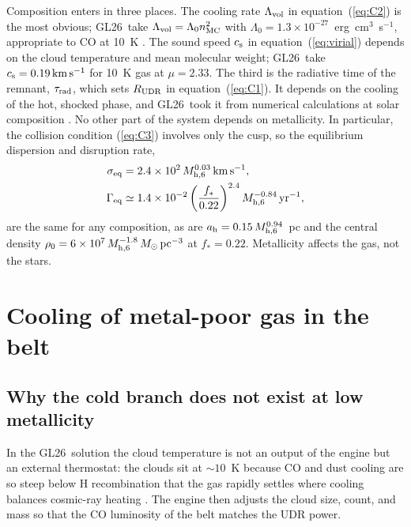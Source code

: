\documentclass[twocolumn,pdftex]{aastex701}
\newcommand{\msun}{M_{\odot}}
\newcommand{\mhsix}{M_{\rm h,6}}
\newcommand{\fst}{f_{\ast}}
\newcommand{\Geq}{\Gamma_{\rm eq}}
\newcommand{\GL}{GL26}
\newcommand{\kms}{\,{\rm km\,s^{-1}}}
\begin{document}
Composition enters in three places. The cooling rate $\Lambda_{\rm vol}$ in equation~(\ref{eq:C2}) is the most obvious; \GL\ take $\Lambda_{\rm vol} = \Lambda_0 n_{\rm MC}^{2}$ with $\Lambda_0 = 1.3\times10^{-27}$~erg~cm$^{3}$~s$^{-1}$, appropriate to CO at 10~K \citep{Goldsmith:1978a,Neufeld:1995a}. The sound speed $c_{\rm s}$ in equation~(\ref{eq:virial}) depends on the cloud temperature and mean molecular weight; \GL\ take $c_{\rm s} = 0.19\kms$ for 10~K gas at $\mu = 2.33$. The third is the radiative time of the remnant, $\tau_{\rm rad}$, which sets $R_{\rm UDR}$ in equation~(\ref{eq:C1}). It depends on the cooling of the hot, shocked phase, and \GL\ took it from numerical calculations at solar composition \citep{Blondin:1998a}. No other part of the system depends on metallicity. In particular, the collision condition (\ref{eq:C3}) involves only the cusp, so the equilibrium dispersion and disruption rate,
\begin{align}
\sigma_{\rm eq} &= 2.4\times10^{2}\,\mhsix^{0.03}\kms, \nonumber\\
\Geq &\simeq 1.4\times10^{-2}\left(\frac{\fst}{0.22}\right)^{2.4}\mhsix^{-0.84}\,{\rm yr^{-1}},
\label{eq:Geq}
\end{align}
are the same for any composition, as are $a_{\rm h} = 0.15\,\mhsix^{0.94}$~pc and the central density $\rho_0 = 6\times10^{7}\,\mhsix^{-1.8}\,\msun\,{\rm pc^{-3}}$ at $\fst = 0.22$. Metallicity affects the gas, not the stars.

\section{Cooling of metal-poor gas in the belt}\label{sec:cooling}

\subsection{Why the cold branch does not exist at low metallicity}\label{sec:coldbranch}

In the \GL\ solution the cloud temperature is not an output of the engine but an external thermostat: the clouds sit at $\sim10$~K because CO and dust cooling are so steep below H recombination that the gas rapidly settles where cooling balances cosmic-ray heating \citep{Krumholz:2015a}. The engine then adjusts the cloud size, count, and mass so that the CO luminosity of the belt matches the UDR power.
\end{document}
